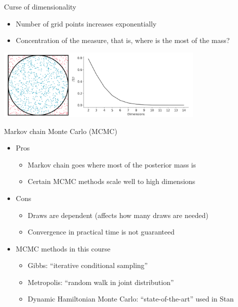 \documentclass[english,t]{beamer}
\begin{document}
\begin{frame}{Curse of dimensionality}

  \begin{itemize}
  \item Number of grid points increases exponentially
  \item Concentration of the measure, that is, where is the most of the
    mass?
  \end{itemize}

  \vspace{0.5\baselineskip}
  \begin{center}
    \includegraphics[width=10cm]{curse_dimensionality.pdf}  
  \end{center}
  

\end{frame}

\begin{frame}{Markov chain Monte Carlo (MCMC)}

  \begin{itemize}
  \item Pros
    \begin{itemize}
    \item Markov chain goes where most of the posterior mass is
    \item Certain MCMC methods scale well to high dimensions
    \end{itemize}
  \item Cons
    \begin{itemize}
    \item Draws are dependent (affects how many draws are needed)
    \item Convergence in practical time is not guaranteed
    \end{itemize}
  \item MCMC methods in this course
    \begin{itemize}
    \item Gibbs: ``iterative conditional sampling''
    \item Metropolis: ``random walk in joint distribution''
    \item Dynamic Hamiltonian Monte Carlo: ``state-of-the-art'' used in Stan
    \end{itemize}
  \end{itemize}

\end{frame}
\end{document}
